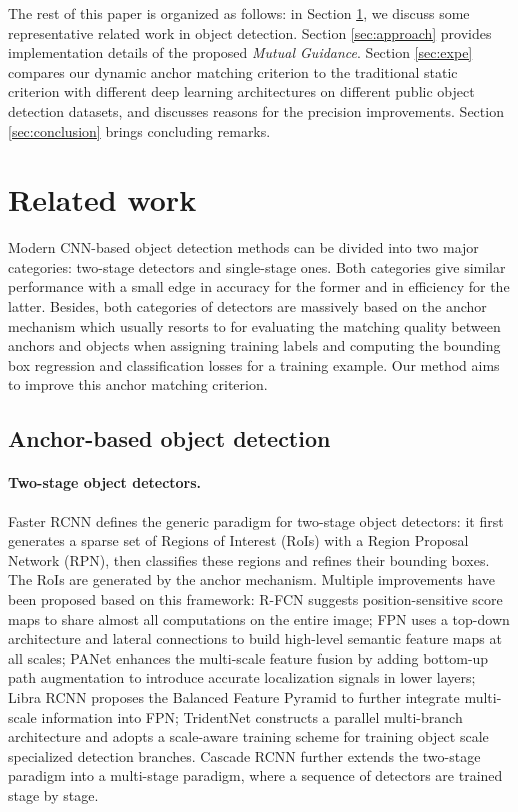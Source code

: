 \documentclass[runningheads]{llncs}
\begin{document}
The rest of this paper is organized as follows: in Section \ref{sec:related}, we discuss some representative related work in object detection. Section \ref{sec:approach} provides implementation details of the proposed \emph{Mutual Guidance}. Section \ref{sec:expe} compares our dynamic anchor matching criterion to the traditional static criterion with different deep learning architectures on different public object detection datasets, and discusses reasons for the precision improvements. Section \ref{sec:conclusion} brings concluding remarks.


\section{Related work}
\label{sec:related}

Modern CNN-based object detection methods can be divided into two major categories: two-stage detectors and single-stage ones. Both categories give similar performance with a small edge in accuracy for the former and in efficiency for the latter.
Besides, both categories of detectors are massively based on the anchor mechanism which usually resorts to  for evaluating the matching quality between  anchors and objects when assigning training labels and computing the bounding box regression and classification losses for a training example. 
Our method aims to improve this anchor matching criterion.

\subsection{Anchor-based object detection}

\paragraph{Two-stage object detectors.}
Faster RCNN \cite{FasterRCNN} defines the generic paradigm for two-stage object detectors: it first generates a sparse set of Regions of Interest (RoIs) with a Region Proposal Network (RPN), then classifies these regions and refines their bounding boxes. The RoIs are generated by the anchor mechanism.
Multiple improvements have been proposed based on this framework: 
R-FCN \cite{RFCN} suggests position-sensitive
score maps to share almost all computations on the entire image; 
FPN \cite{FPN} uses a top-down architecture and lateral connections to build high-level semantic feature maps at all scales; 
PANet \cite{PANet} enhances the multi-scale feature fusion by adding bottom-up path augmentation to introduce accurate localization signals in lower layers; 
Libra RCNN \cite{LibraRCNN} proposes the Balanced Feature Pyramid to further integrate multi-scale information into FPN; 
TridentNet \cite{TridentNet} constructs a parallel multi-branch architecture and adopts a scale-aware training scheme for training object scale specialized detection branches.
Cascade RCNN \cite{CascadeRCNN} further extends the two-stage paradigm into a multi-stage paradigm, where a sequence of detectors are trained stage by stage.
\end{document}
